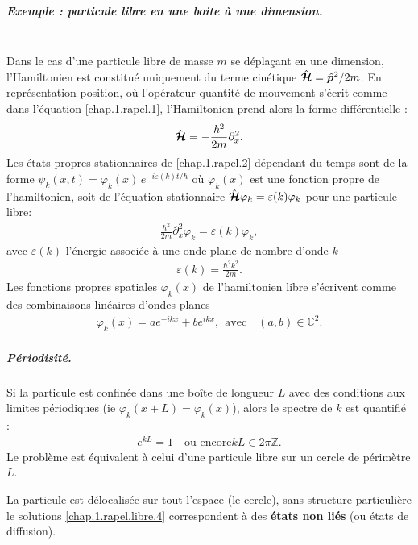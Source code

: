 \begin{mdframed}[
	linewidth=0.5pt, 
	backgroundcolor=gray!5, 
	roundcorner=50pt,	
	innerleftmargin=5pt,
    innerrightmargin=5pt,
    innertopmargin=-10pt,
    innerbottommargin=2pt,
    leftmargin=2pt,
    rightmargin=2pt
	]
\subparagraph{Exemple : particule libre en une boite à une dimension.} 
	{~}\\
	
	Dans le cas d’une particule libre de masse $m$ se déplaçant en une dimension, l’Hamiltonien est constitué uniquement du terme cinétique $\hat{\bm{\mathcal{H}}} = \hat{\bm{p}}^2 / 2m$. En représentation position, où l’opérateur quantité de mouvement s’écrit comme dans l’équation \eqref{chap.1.rapel.1}, l’Hamiltonien prend alors la forme différentielle :
	\begin{eqnarray}
		\hat{\bm{\mathcal{H}}} = -\frac{\hbar^2}{2m} \partial_x^2.\label{chap.1.rapel.libre.1}
	\end{eqnarray}
	Les états propres stationnaires de \eqref{chap.1.rapel.2} dépendant du temps sont de la forme $\psi_k(x,t) = \varphi_k(x)\,e^{-i\varepsilon(k)t/\hbar}$ où $\varphi_k(x)$ est une fonction propre de l’hamiltonien,  soit de  l’équation stationnaire  $\hat{\bm{\mathcal{H}}}\varphi_k = \varepsilon(k)\varphi_k$ \ie pour une particule libre:
	\begin{eqnarray}
		\frac{\hbar^2}{2m} \partial_x^2 \varphi_k = \varepsilon(k) \varphi_k,\label{chap.1.rapel.libre.2}
	\end{eqnarray}
	avec $\varepsilon(k)$ l’énergie associée à une onde plane de nombre d’onde $k$
	\begin{eqnarray}
		\varepsilon(k) = \frac{\hbar^2 k^2 }{2 m}\label{chap.1.rapel.libre.3}.
	\end{eqnarray}
	Les fonctions propres spatiales $\varphi_k(x)$ de l’hamiltonien libre s’écrivent comme des combinaisons linéaires d’ondes planes  
	\begin{eqnarray}
		\varphi_k(x) = a e^{-i k x} + b e^{i k x},~~ \mbox{avec}\quad  (a,b) \in \mathbb{C}^2\label{chap.1.rapel.libre.4}.
	\end{eqnarray}
\subparagraph{Périodisité.}
	Si la particule est confinée dans une boîte de longueur $L$ avec des conditions aux limites périodiques (ie $\varphi_k(x+L) = \varphi_k(x)$), alors le spectre de $k$ est quantifié : 
	\begin{eqnarray}
		e^{kL}= 1 \quad\mbox{ou encore} kL \in 2\pi\mathbb{Z}\label{chap.1.rapel.libre.5}.
	\end{eqnarray}
	Le problème est équivalent à celui d’une particule libre sur un cercle de périmètre $L$.\\
	
	\medskip
	
	La particule est délocalisée sur tout l’espace (le cercle), sans structure particulière \ie le solutions \eqref{chap.1.rapel.libre.4} correspondent à des {\bf états non liés} (ou états de diffusion).

\end{mdframed}

